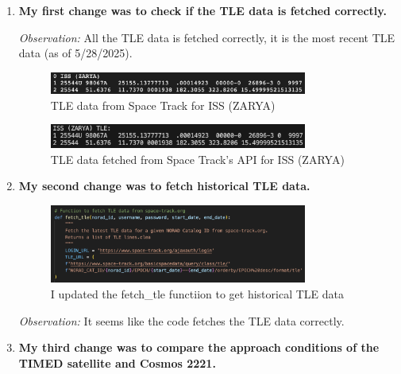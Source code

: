 \documentclass[12pt]{report}
\begin{document}
\begin{enumerate}
  \item \textbf{My first change was to check if the TLE data is fetched correctly.}

  \textit{Observation:} All the TLE data is fetched correctly, it is the most recent TLE data (as of 5/28/2025).
  
  \begin{figure}[H]
    \centering
    \includegraphics[width=0.8\textwidth]{figure_week_3_tle_space_track.png}
    \caption{TLE data from Space Track for ISS (ZARYA)}
    \label{fig:tle_space_track}
  \end{figure}

  \begin{figure}[H]
    \centering
    \includegraphics[width=0.8\textwidth]{figure_week_3_tle_fetched.png}
    \caption{TLE data fetched from Space Track's API for ISS (ZARYA)}
    \label{fig:tle_fetched}
  \end{figure}

  \item \textbf{My second change was to fetch historical TLE data.}

  \begin{figure}[H]
    \centering
    \includegraphics[width=0.8\textwidth]{figure_week_3_historicalTLE.png}
    \caption{I updated the fetch\_tle functiion to get historical TLE data}
    \label{fig:historical_tle}
  \end{figure}

  \textit{Observation:} It seems like the code fetches the TLE data correctly.\\

  \item \textbf{My third change was to compare the approach conditions of the TIMED satellite and Cosmos 2221.}
    

\end{enumerate}
\end{document}
